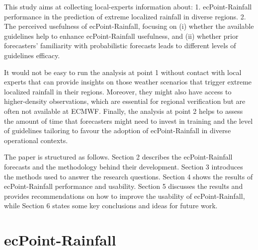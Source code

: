 \documentclass[twocol]{ametsocV5} %
\begin{document}
This study aims at collecting local-experts information about:
1.	ecPoint-Rainfall performance in the prediction of extreme localized rainfall in diverse regions.
2.	The perceived usefulness of ecPoint-Rainfall, focusing on (i) whether the available guidelines help to enhance ecPoint-Rainfall usefulness, and (ii) whether prior forecasters’ familiarity with probabilistic forecasts leads to different levels of guidelines efficacy. 

It would not be easy to run the analysis at point 1 without contact with local experts that can provide insights on those weather scenarios that trigger extreme localized rainfall in their regions. Moreover, they might also have access to higher-density observations, which are essential for regional verification but are often not available at ECMWF. Finally, the analysis at point 2 helps to assess the amount of time that forecasters might need to invest in training  and the level of guidelines tailoring to favour the adoption of ecPoint-Rainfall in diverse operational contexts. 

The paper is structured as follows. Section 2 describes the ecPoint-Rainfall forecasts and the methodology behind their development. Section 3 introduces the methods used to answer the research questions. Section 4 shows the results of ecPoint-Rainfall performance and usability. Section 5 discusses the results and provides recommendations on how to improve the usability of ecPoint-Rainfall, while Section 6 states some key conclusions and ideas for future work.







\section{ecPoint-Rainfall}
\end{document}
